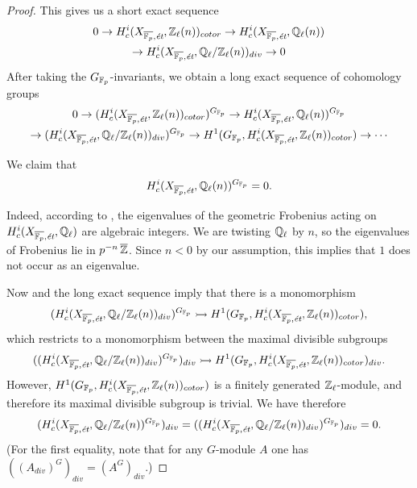 \begin{proposition}
\begin{proof}
    This gives us a short exact sequence
    \begin{multline*}
      0 \to H^i_c (X_{\overline{\mathbb{F}_p},\text{\it ét}}, \mathbb{Z}_\ell (n))_{cotor} \to
      H^i_c (X_{\overline{\mathbb{F}_p},\text{\it ét}}, \mathbb{Q}_\ell (n)) \\
      \to H^i_c (X_{\overline{\mathbb{F}_p},\text{\it ét}}, \mathbb{Q}_\ell/\mathbb{Z}_\ell (n))_{div} \to 0
    \end{multline*}
    After taking the $G_{\mathbb{F}_p}$-invariants, we obtain a long exact sequence of
    cohomology groups
    \begin{multline}
      \label{eqn:cohomology-long-exact-sequence-with-GFp}
      0 \to (H^i_c (X_{\overline{\mathbb{F}_p},\text{\it ét}}, \mathbb{Z}_\ell (n))_{cotor})^{G_{\mathbb{F}_p}} \to
      H^i_c (X_{\overline{\mathbb{F}_p},\text{\it ét}}, \mathbb{Q}_\ell (n))^{G_{\mathbb{F}_p}} \\
      \to (H^i_c (X_{\overline{\mathbb{F}_p},\text{\it ét}}, \mathbb{Q}_\ell/\mathbb{Z}_\ell (n))_{div})^{G_{\mathbb{F}_p}} \to
      H^1 (G_{\mathbb{F}_p}, H^i_c (X_{\overline{\mathbb{F}_p},\text{\it ét}}, \mathbb{Z}_\ell (n))_{cotor}) \to \cdots
    \end{multline}

    We claim that
    \begin{equation}
      \label{eqn:SGA-7-expose-XXI-5-5-3}
      H^i_c (X_{\overline{\mathbb{F}_p},\text{\it ét}}, \mathbb{Q}_\ell (n))^{G_{\mathbb{F}_p}} = 0.
    \end{equation}

    Indeed, according to \cite[Exposé XXI, 5.5.3]{SGA7}, the eigenvalues of the
    geometric Frobenius acting on
    $H^i_c (X_{\overline{\mathbb{F}_p},\text{\it ét}}, \mathbb{Q}_\ell)$ are algebraic
    integers. We are twisting $\mathbb{Q}_\ell$ by $n$, so the eigenvalues of Frobenius
    lie in $p^{-n}\,\overline{\mathbb{Z}}$. Since $n < 0$ by our assumption, this
    implies that $1$ does not occur as an eigenvalue.

    Now  and the long exact sequence
     imply that there is a
    monomorphism
    \[ (H^i_c (X_{\overline{\mathbb{F}_p},\text{\it ét}}, \mathbb{Q}_\ell/\mathbb{Z}_\ell (n))_{div})^{G_{\mathbb{F}_p}} \rightarrowtail
      H^1 (G_{\mathbb{F}_p}, H^i_c (X_{\overline{\mathbb{F}_p},\text{\it ét}}, \mathbb{Z}_\ell (n))_{cotor}), \]
    which restricts to a monomorphism between the maximal divisible subgroups
    \[ ((H^i_c (X_{\overline{\mathbb{F}_p},\text{\it ét}}, \mathbb{Q}_\ell/\mathbb{Z}_\ell (n))_{div})^{G_{\mathbb{F}_p}})_{div} \rightarrowtail
      H^1 (G_{\mathbb{F}_p}, H^i_c (X_{\overline{\mathbb{F}_p},\text{\it ét}}, \mathbb{Z}_\ell (n))_{cotor})_{div}. \]
    However,
    $H^1 (G_{\mathbb{F}_p}, H^i_c (X_{\overline{\mathbb{F}_p},\text{\it ét}}, \mathbb{Z}_\ell (n))_{cotor})$
    is a finitely generated $\mathbb{Z}_\ell$-module, and therefore its maximal
    divisible subgroup is trivial. We have therefore
    \[ (H^i_c (X_{\overline{\mathbb{F}_p},\text{\it ét}}, \mathbb{Q}_\ell/\mathbb{Z}_\ell (n))^{G_{\mathbb{F}_p}})_{div} =
      ((H^i_c (X_{\overline{\mathbb{F}_p},\text{\it ét}}, \mathbb{Q}_\ell/\mathbb{Z}_\ell (n))_{div})^{G_{\mathbb{F}_p}})_{div} = 0. \]
    (For the first equality, note that for any $G$-module $A$ one has
    $((A_{div})^G)_{div} = (A^G)_{div}$.)
  \end{proof}
\end{proposition}

